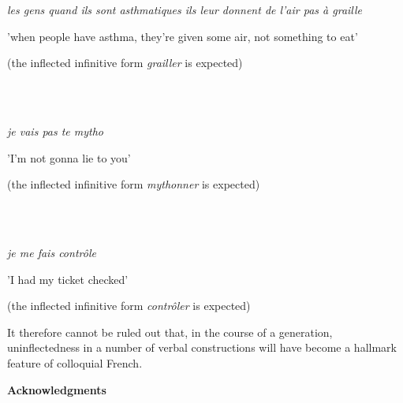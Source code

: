 \documentclass[output=paper]{langscibook}
\begin{document}
          \textit{les gens quand ils sont asthmatiques ils leur donnent de l'air pas   à graille}

  {}'when people have asthma, they're given some air, not something   to eat'

  (the inflected infinitive form \textit{grailler} is expected)

\ea%
    \label{ex:key:16}
    \gll \\
         \\
    \glt
    \z %

          \textit{je vais pas te mytho}

  {}'I'm not gonna lie to you'

  (the inflected infinitive form \textit{mythonner} is expected)

\ea%
    \label{ex:key:17}
    \gll \\
         \\
    \glt
    \z %

          \textit{je me fais contrôle}

  {}'I had my ticket checked'

  (the inflected infinitive form \textit{contrôler} is expected)

It therefore cannot be ruled out that, in the course of a generation, uninflectedness in a number of verbal constructions will have become a hallmark feature of colloquial French.

\textbf{Acknowledgments}
\end{document}
